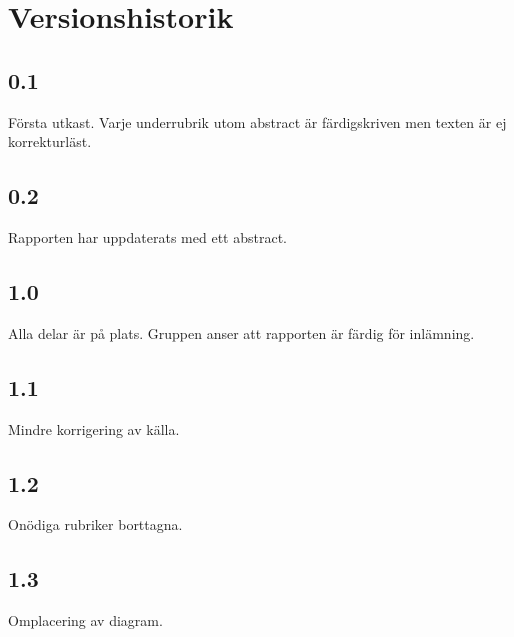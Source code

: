 \section*{Versionshistorik}
\subsection*{0.1}
Första utkast. Varje underrubrik utom abstract är färdigskriven men texten är ej korrekturläst.

\subsection*{0.2}
Rapporten har uppdaterats med ett abstract.

\subsection*{1.0}
Alla delar är på plats. Gruppen anser att rapporten är färdig för inlämning.

\subsection*{1.1}
Mindre korrigering av källa.

\subsection*{1.2}
Onödiga rubriker borttagna.

\subsection*{1.3} %
Omplacering av diagram.
